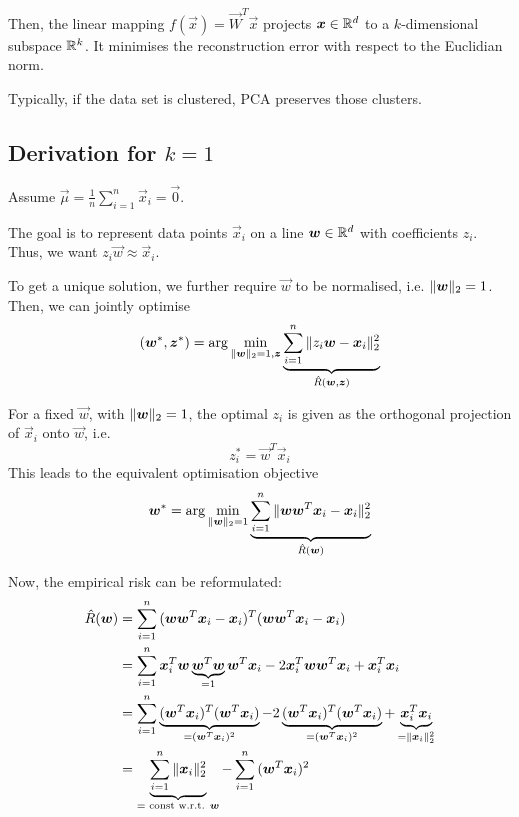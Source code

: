 Then, the linear mapping $f(\vec{x}) = \vec{W}^T \vec{x}$
projects $\boldsymbol{x} \in \mathbb{R}^d$ to a $k$-dimensional
subspace $\mathbb{R}^k$.
It minimises the reconstruction error with respect to
the Euclidian norm.

Typically, if the data set is clustered,
PCA preserves those clusters.


\subsection{Derivation for $k = 1$}
Assume $\vec{\mu} = \frac{1}{n} \sum_{i=1}^n{\vec{x}_i} = \vec{0}$.

The goal is to represent data points $\vec{x}_i$ on a line
$\boldsymbol{w} \in \mathbb{R}^d$ with coefficients $z_i$.
Thus, we want $z_i \vec{w} \approx \vec{x}_i$.

To get a unique solution, we further require $\vec{w}$
to be normalised, i.e. $\lVert\boldsymbol{w}\rVert_2 = 1$.
Then, we can jointly optimise
\begin{equation*}
(\boldsymbol{w}^*, \boldsymbol{z}^*) = \arg\min_{\lVert\boldsymbol{w}\rVert_2 = 1, \boldsymbol{z}}{
	\underbrace{
		\sum_{i=1}^n{\lVert z_i \boldsymbol{w} - \boldsymbol{x}_i\rVert_2^2}
	}_{\hat{R}(\boldsymbol{w}, \boldsymbol{z})}
}
\end{equation*}

For a fixed $\vec{w}$, with $\lVert\boldsymbol{w}\rVert_2 = 1$,
the optimal $z_i$ is given as the
orthogonal projection of $\vec{x}_i$ onto $\vec{w}$, i.e.
\begin{equation*}
z_i^* = \vec{w}^T \vec{x}_i
\end{equation*}
This leads to the equivalent optimisation objective
\begin{equation*}
\boldsymbol{w}^* = \arg\min_{\lVert\boldsymbol{w}\rVert_2 = 1}{
	\underbrace{
		\sum_{i=1}^n{\lVert\boldsymbol{w} \boldsymbol{w}^T \boldsymbol{x}_i - \boldsymbol{x}_i\rVert_2^2}
	}_{\hat{R}(\boldsymbol{w})}
}
\end{equation*}

Now, the empirical risk can be reformulated:
\begin{align*}
\hat{R}(\boldsymbol{w}) &= \sum_{i=1}^n{
	(\boldsymbol{w} \boldsymbol{w}^T \boldsymbol{x}_i - \boldsymbol{x}_i)^T
	(\boldsymbol{w} \boldsymbol{w}^T \boldsymbol{x}_i - \boldsymbol{x}_i)
} \\
&= \sum_{i=1}^n{
	\boldsymbol{x}_i^T \boldsymbol{w} \underbrace{\boldsymbol{w}^T \boldsymbol{w}}_{=1} \boldsymbol{w}^T \boldsymbol{x}_i
	- 2 \boldsymbol{x}_i^T \boldsymbol{w} \boldsymbol{w}^T \boldsymbol{x}_i
	+ \boldsymbol{x}_i^T \boldsymbol{x}_i
} \\
&= \sum_{i=1}^n{
	\underbrace{(\boldsymbol{w}^T \boldsymbol{x}_i)^T (\boldsymbol{w}^T \boldsymbol{x}_i)}_{= (\boldsymbol{w}^T \boldsymbol{x}_i)^2}
	- 2 \underbrace{(\boldsymbol{w}^T \boldsymbol{x}_i)^T (\boldsymbol{w}^T \boldsymbol{x}_i)}_{= (\boldsymbol{w}^T \boldsymbol{x}_i)^2}
	+ \underbrace{\boldsymbol{x}_i^T \boldsymbol{x}_i}_{= \lVert\boldsymbol{x}_i\rVert_2^2}
} \\
&= \underbrace{\sum_{i=1}^n{\lVert\boldsymbol{x}_i\rVert_2^2}}_{
	= \text{ const w.r.t. $\boldsymbol{w}$}
}
- \sum_{i=1}^n{(\boldsymbol{w}^T \boldsymbol{x}_i)^2}
\end{align*}

